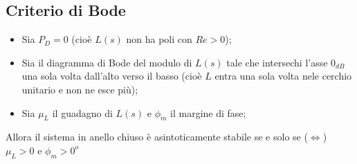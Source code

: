 \begin{landscape}
\begin{multicols*}{3}
    \subsection*{Criterio di Bode}
    \begin{itemize}
        \item Sia $P_D = 0$ (cioè $L(s)$ non ha poli con $Re > 0$);
        \item Sia il diagramma di Bode del modulo di $L(s)$ tale che intersechi l'asse $0_{dB}$ una sola volta dall'alto verso il basso (cioè $L$ entra una sola volta nele cerchio unitario e non ne esce più);
        \item Sia $\mu_L$ il guadagno di $L(s)$ e $\phi_m$ il margine di fase;
    \end{itemize}
    Allora il sistema in anello chiuso è asintoticamente stabile se e solo se ($\Leftrightarrow$) $\mu_L > 0$ e $\phi_m > 0^o$
    \end{multicols*}
\end{landscape}